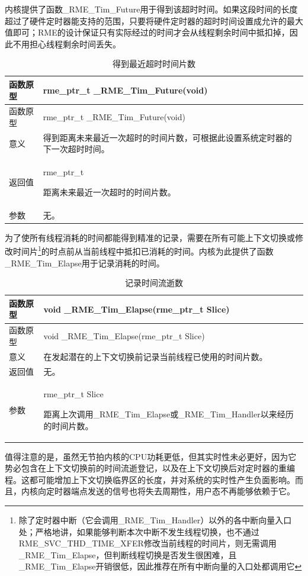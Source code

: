内核提供了函数\_RME\_Tim\_Future用于得到该超时时间。如果这段时间的长度超过了硬件定时器能支持的范围，只要将硬件定时器的超时时间设置成允许的最大值即可；RME的设计保证只有实际经过的时间才会从线程剩余时间中抵扣掉，因此不用担心线程剩余时间丢失。

\begin{xltabular}{\textwidth}{@{}>{\hsize\raggedright\arraybackslash}X>{\hsize\raggedright\arraybackslash}X@{}}
\caption{得到最近超时时间片数}\label{tab:9-1-latest-timeout-slices}\\
\toprule
函数原型 & rme\_ptr\_t \_RME\_Tim\_Future(void)\tabularnewline
\endfirsthead
\toprule
函数原型 & rme\_ptr\_t \_RME\_Tim\_Future(void)\tabularnewline
\midrule
\endhead
\bottomrule
\endlastfoot
意义 &
得到距离未来最近一次超时的时间片数，可根据此设置系统定时器的下一次超时时间。\tabularnewline
返回值\strut
 & rme\_ptr\_t

距离未来最近一次超时的时间片数。\strut
\tabularnewline
参数 & 无。\tabularnewline
\end{xltabular}

为了使所有线程消耗的时间都能得到精准的记录，需要在所有可能上下文切换或修改时间片\footnote{除了定时器中断（它会调用\_RME\_Tim\_Handler）以外的各中断向量入口处；严格地讲，如果能够判断本次中断不发生线程切换，也不通过RME\_SVC\_THD\_TIME\_XFER修改当前线程的时间片，则无需调用\_RME\_Tim\_Elapse，但判断线程切换是否发生很困难，且\_RME\_Tim\_Elapse开销很低，因此推荐在所有中断向量的入口处都调用它}的时点前从当前线程中抵扣已消耗的时间。内核为此提供了函数\_RME\_Tim\_Elapse用于记录消耗的时间。

\begin{xltabular}{\textwidth}{@{}>{\hsize\raggedright\arraybackslash}X>{\hsize\raggedright\arraybackslash}X@{}}
\caption{记录时间流逝数}\label{tab:9-2-record-elapsed-time}\\
\toprule
函数原型 & void \_RME\_Tim\_Elapse(rme\_ptr\_t Slice)\tabularnewline
\endfirsthead
\toprule
函数原型 & void \_RME\_Tim\_Elapse(rme\_ptr\_t Slice)\tabularnewline
\midrule
\endhead
\bottomrule
\endlastfoot
意义 &
在发起潜在的上下文切换前记录当前线程已使用的时间片数。\tabularnewline
返回值 & 无。\tabularnewline
参数\strut
 & rme\_ptr\_t Slice

距离上次调用\_RME\_Tim\_Elapse或\_RME\_Tim\_Handler以来经历的时间片数。\strut
\tabularnewline
\end{xltabular}

值得注意的是，虽然无节拍内核的CPU功耗更低，但其实时性未必更好，因为它势必包含在上下文切换前的时间流逝登记，以及在上下文切换后对定时器的重编程。这都可能增加上下文切换临界区的长度，并对系统的实时性产生负面影响。而且，内核向定时器端点发送的信号也将失去周期性，用户态不再能够依赖于它。

